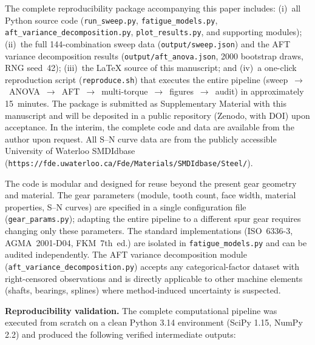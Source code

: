 \documentclass[twocolumn,12pt,a4paper]{article}
\begin{document}
The complete reproducibility package accompanying this paper includes:
(i)~all Python source code (\texttt{run\_sweep.py},
\texttt{fatigue\_models.py}, \texttt{aft\_variance\_decomposition.py},
\texttt{plot\_results.py}, and supporting modules);
(ii)~the full 144-combination sweep data
(\texttt{output/sweep.json}) and the AFT variance decomposition
results (\texttt{output/aft\allowbreak\_anova\allowbreak.json},
2000 bootstrap draws, RNG seed~42);
(iii)~the LaTeX source of this manuscript; and
(iv)~a one-click reproduction script (\texttt{reproduce.sh}) that
executes the entire pipeline (sweep~$\rightarrow$~ANOVA~$\rightarrow$~AFT~$\rightarrow$~multi-torque~$\rightarrow$~figures~$\rightarrow$~audit)
in approximately 15~minutes.
The package is submitted as Supplementary Material with this
manuscript and will be deposited in a public repository (Zenodo,
with DOI) upon acceptance. In the interim, the complete code and
data are available from the author upon request. All S--N curve data are from the
publicly accessible University of Waterloo SMDIdbase
(\texttt{https://fde.uwaterloo.ca/\allowbreak Fde/Materials/\allowbreak SMDIdbase/Steel/}).

The code is modular and designed for reuse beyond the present gear
geometry and material. The gear parameters (module, tooth count, face
width, material properties, S--N curves) are specified in a single
configuration file (\texttt{gear\_params.py}); adapting the entire
pipeline to a different spur gear requires changing only these
parameters. The standard implementations (ISO~6336-3, AGMA~2001-D04,
FKM~7th~ed.) are isolated in \texttt{fatigue\_models.py} and can be
audited independently. The AFT variance decomposition module
(\texttt{aft\_variance\_decomposition.py}) accepts any
categorical-factor dataset with right-censored observations and is
directly applicable to other machine elements (shafts, bearings,
splines) where method-induced uncertainty is suspected.

\textbf{Reproducibility validation.} The complete computational
pipeline was executed from scratch on a clean Python 3.14 environment
(SciPy 1.15, NumPy 2.2) and produced the following verified
intermediate outputs:
\end{document}
